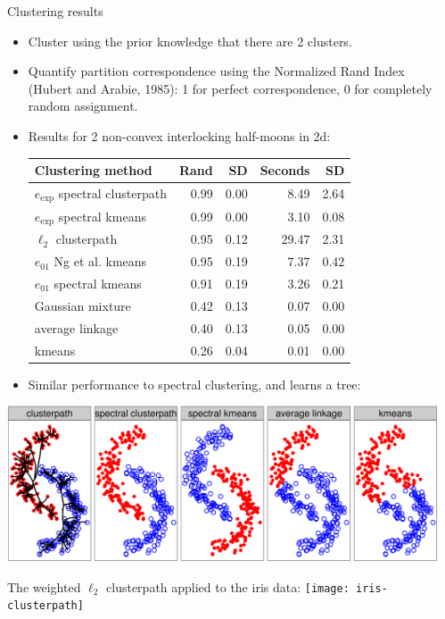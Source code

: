 \documentclass[final]{beamer}
\begin{document}
\begin{frame}{}
\begin{columns}[T]
\begin{column}{0.315\linewidth}
\end{column}\hfill
\begin{column}{0.315\linewidth}



\begin{block}{Clustering results}
\begin{itemize}
\item Cluster using the prior knowledge that there are 2 clusters.
\item Quantify partition correspondence using the Normalized Rand
  Index (Hubert and Arabie, 1985): 1 for perfect correspondence, 0 for
  completely random assignment.
\item Results for 2 non-convex interlocking half-moons in 2d:
\begin{center}
\begin{tabular}{lrrrr}
\hline
  Clustering method & Rand & SD & Seconds & SD \\ 
  \hline
  $e_{\exp}$ spectral clusterpath & 0.99 & 0.00 & 8.49 & 2.64 \\ 
  $e_{\exp}$ spectral kmeans & 0.99 & 0.00 & 3.10 & 0.08 \\ 
  $\ell_2$ clusterpath & 0.95 & 0.12 & 29.47 & 2.31 \\ 
  $e_{01}$ Ng et al. kmeans & 0.95 & 0.19 & 7.37 & 0.42 \\ 
  $e_{01}$ spectral kmeans & 0.91 & 0.19 & 3.26 & 0.21 \\ 
  Gaussian mixture & 0.42 & 0.13 & 0.07 & 0.00 \\
  average linkage & 0.40 & 0.13 & 0.05 & 0.00 \\ 
  kmeans & 0.26 & 0.04 & 0.01 & 0.00 \\ 
\hline
\end{tabular}
\end{center}
\item Similar performance to spectral clustering, and learns a tree:
\end{itemize}
\end{block}
\includegraphics[width=0.3\paperwidth]{moons}

The weighted $\ell_2$ clusterpath applied to the iris data:
\texttt{[image: iris-clusterpath]}
 


\end{column}
\end{columns}

\end{frame}
\end{document}
